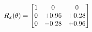 \documentclass[preview]{standalone}
\begin{document}
\begin{align*}
\special{dvisvgm:raw <g id='unique000'>}R_{x}(\theta) = \begin{bmatrix}1 & 0 & 0 \\0 & +0.96 & +0.28 \\0 & -0.28 & +0.96\end{bmatrix}\special{dvisvgm:raw </g>}
\end{align*}
\end{document}
